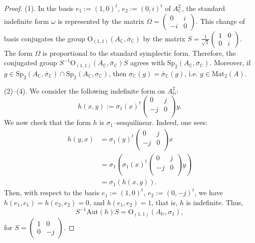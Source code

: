 \documentclass[oneside,11pt]{amsart}
\theoremstyle{definition}
\theoremstyle{remark}
\numberwithin{thm}{section}
\numberwithin{equation}{section}
\begin{document}
\begin{proof}
(1). In the basis $e_1:=(1,0)^t$, $e_2:=(0,i)^t$ of $A_\mathbb C^2$, the standard indefinite form $\omega$ is represented by the matrix $\Omega=\begin{pmatrix}
    0 & i \\
    -i & 0
\end{pmatrix}$. This change of basis conjugates the group $\mathrm{O}_{(1,1)}(A_\mathbb C,\bar\sigma_\mathbb C)$ by the matrix $S=\frac{1}{\sqrt{2}}\begin{pmatrix}
    1 & 0 \\
    0 & i
\end{pmatrix}$.
The form $\Omega$ is proportional to the standard symplectic form. Therefore, the conjugated group $S^{-1}\mathrm{O}_{(1,1)}(A_\mathbb C,\bar\sigma_\mathbb C)S$ agrees with $\mathrm{Sp}_{2}(A_\mathbb C,\bar\sigma_\mathbb C)$.  Moreover, if $g\in \mathrm{Sp}_{2}(A_\mathbb C,\bar\sigma_\mathbb C)\cap \mathrm{Sp}_{2}(A_\mathbb C,\sigma_\mathbb C)$, then $\sigma_\mathbb C(g)=\bar\sigma_\mathbb C(g)$, i.e. $g\in\mathrm{Mat}_2(A)$.
\vspace{2mm}

\noindent (2)--(4). We consider the following indefinite form on $A_{\mathbb{H}}^{2}$:
\[h(x,y):={{\sigma }_{1}}{{(x)}^{t}}\begin{pmatrix}
   0 & j  \\
   -j & 0  \\
\end{pmatrix}y.\]
We now check that the form $h$ is ${{\sigma }_{1}}$--sesquilinear. Indeed, one sees: 
\begin{align*}
h(y,x)  & =\sigma_1(y)^t\begin{pmatrix}
   0 & j  \\
   -j & 0  \\
\end{pmatrix}x\\
 & =\sigma_1\left( \sigma_1(x)^t\begin{pmatrix}
   0 & j  \\
   -j & 0  \\
\end{pmatrix}y \right)\\
& =\sigma_1\left( h(x,y) \right).
\end{align*}
Then, with respect to the basis $e_1:=\left(1,0\right)^t$, $e_2:=\left(0,-j\right)^t$, we have $h\left( {{e}_{1}},{{e}_{1}} \right)=h\left( {{e}_{2}},{{e}_{2}} \right)=0$, and $h\left( {{e}_{1}},{{e}_{2}} \right)=1$, that is, $h$ is indefinite. Thus, 
$$S^{-1}\mathrm{Aut}(h)S=\mathrm{O}_{(1,1)}(A_\mathbb H,\sigma_1),$$
for $S=\begin{pmatrix}
    1 & 0 \\
    0 & -j 
\end{pmatrix}$.


\end{proof}
\end{document}
